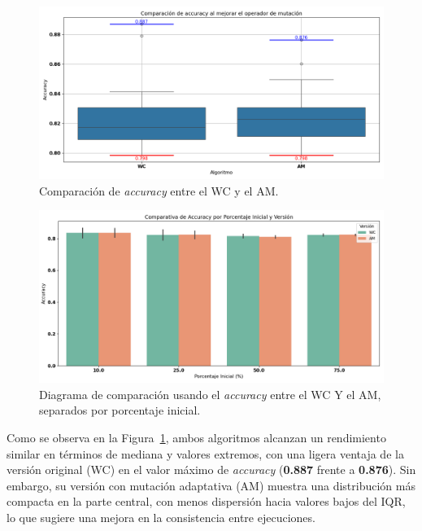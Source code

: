 \begin{figure}[htp]
    \centering
    \includegraphics[width=1\textwidth]{imagenes/evaluaciones/mutacion-adaptativa}
    \caption{Comparación de \textit{accuracy} entre el WC y el AM.}
    \label{fig:mutacion-adaptativa}
\end{figure}

\begin{figure}[htp]
    \centering
    \includegraphics[width=1\textwidth]{imagenes/evaluaciones/mutacion-adaptativa_por_porcentaje}
    \caption{Diagrama de comparación usando el \textit{accuracy} entre el WC Y el AM, separados por porcentaje inicial.}
    \label{fig:mutacion-adaptativa-porcentaje}
\end{figure}

Como se observa en la Figura~\ref{fig:mutacion-adaptativa}, ambos algoritmos alcanzan un rendimiento similar en términos de mediana y valores extremos,
con una ligera ventaja de la versión original (WC) en el valor máximo de \textit{accuracy} (\textbf{0.887} frente a \textbf{0.876}).
Sin embargo, su versión con mutación adaptativa (AM) muestra una distribución más compacta en la parte central,
con menos dispersión hacia valores bajos del IQR, lo que sugiere una mejora en la consistencia entre ejecuciones.


